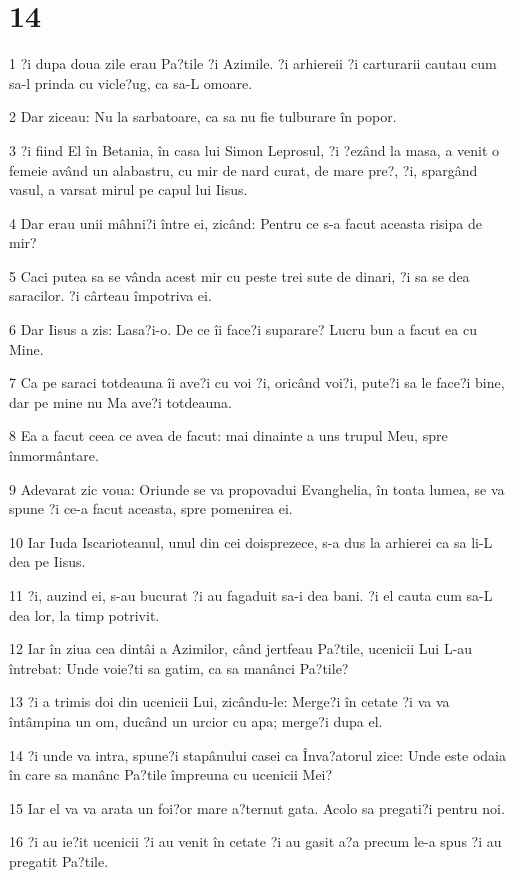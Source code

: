 \chapter{14}

\par 1 ?i dupa doua zile erau Pa?tile ?i Azimile. ?i arhiereii ?i carturarii cautau cum sa-l prinda cu vicle?ug, ca sa-L omoare.
\par 2 Dar ziceau: Nu la sarbatoare, ca sa nu fie tulburare în popor.
\par 3 ?i fiind El în Betania, în casa lui Simon Leprosul, ?i ?ezând la masa, a venit o femeie având un alabastru, cu mir de nard curat, de mare pre?, ?i, spargând vasul, a varsat mirul pe capul lui Iisus.
\par 4 Dar erau unii mâhni?i între ei, zicând: Pentru ce s-a facut aceasta risipa de mir?
\par 5 Caci putea sa se vânda acest mir cu peste trei sute de dinari, ?i sa se dea saracilor. ?i cârteau împotriva ei.
\par 6 Dar Iisus a zis: Lasa?i-o. De ce îi face?i suparare? Lucru bun a facut ea cu Mine.
\par 7 Ca pe saraci totdeauna îi ave?i cu voi ?i, oricând voi?i, pute?i sa le face?i bine, dar pe mine nu Ma ave?i totdeauna.
\par 8 Ea a facut ceea ce avea de facut: mai dinainte a uns trupul Meu, spre înmormântare.
\par 9 Adevarat zic voua: Oriunde se va propovadui Evanghelia, în toata lumea, se va spune ?i ce-a facut aceasta, spre pomenirea ei.
\par 10 Iar Iuda Iscarioteanul, unul din cei doisprezece, s-a dus la arhierei ca sa li-L dea pe Iisus.
\par 11 ?i, auzind ei, s-au bucurat ?i au fagaduit sa-i dea bani. ?i el cauta cum sa-L dea lor, la timp potrivit.
\par 12 Iar în ziua cea dintâi a Azimilor, când jertfeau Pa?tile, ucenicii Lui L-au întrebat: Unde voie?ti sa gatim, ca sa manânci Pa?tile?
\par 13 ?i a trimis doi din ucenicii Lui, zicându-le: Merge?i în cetate ?i va va întâmpina un om, ducând un urcior cu apa; merge?i dupa el.
\par 14 ?i unde va intra, spune?i stapânului casei ca Înva?atorul zice: Unde este odaia în care sa manânc Pa?tile împreuna cu ucenicii Mei?
\par 15 Iar el va va arata un foi?or mare a?ternut gata. Acolo sa pregati?i pentru noi.
\par 16 ?i au ie?it ucenicii ?i au venit în cetate ?i au gasit a?a precum le-a spus ?i au pregatit Pa?tile.
